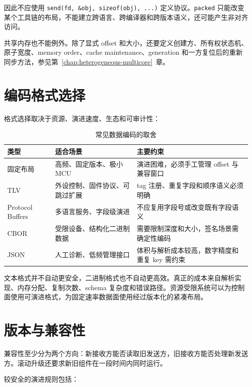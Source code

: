因此不应使用 \texttt{send(fd, \&obj, sizeof(obj), ...)} 定义协议。\texttt{packed} 只能改变某个工具链的布局，不能建立跨语言、跨编译器和跨版本语义，还可能产生非对齐访问。

共享内存也不能例外。除了显式 offset 和大小，还要定义创建方、所有权状态机、原子宽度、memory order、cache maintenance、generation 和一方复位后的重新同步方法，参见第~\ref{chap:heterogeneous-multicore}~章。

\section{编码格式选择}

格式选择取决于资源、演进速度、生态和可审计性：

\begin{table}[htbp]
  \centering
  \caption{常见数据编码的取舍}
  \begin{tabular}{p{27mm}p{48mm}p{58mm}}
    \hline
    类型 & 适合场景 & 主要约束 \\
    \hline
    固定布局 & 高频、固定版本、极小 MCU & 演进困难，必须手工管理 offset 与兼容窗口 \\
    TLV & 外设控制、固件协议、可跳过扩展 & tag 注册、重复字段和顺序语义必须明确 \\
    Protocol Buffers & 多语言服务、字段级演进 & 不应复用字段号或改变既有字段语义\cite{protobuf-encoding,protobuf-best-practices} \\
    CBOR & 受限设备、结构化二进制数据 & 需要限制深度和大小，签名场景需确定性编码\cite{rfc8949} \\
    JSON & 人工诊断、低频管理接口 & 体积与解析成本较高，数字精度和重复 key 需约束 \\
    \hline
  \end{tabular}
\end{table}

文本格式并不自动更安全，二进制格式也不自动更高效。真正的成本来自解析实现、内存分配、复制次数、schema 复杂度和错误路径。资源受限系统可以为控制面使用可演进格式，为固定速率数据面使用经过版本化的紧凑布局。

\section{版本与兼容性}

兼容性至少分为两个方向：新接收方能否读取旧发送方，旧接收方能否处理新发送方。滚动升级还要求新旧组件在一段时间内同时运行。

较安全的演进规则包括：

